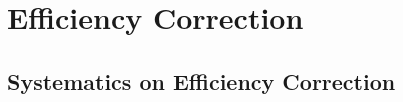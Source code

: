 \section{Efficiency Correction}\label{sec:EffCorrection}
\subsection{Systematics on Efficiency Correction}\label{sec:angSys}

